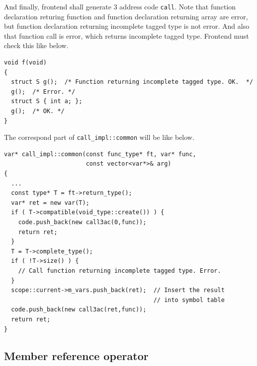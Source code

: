 And finally, frontend shall generate 3 address code {\tt{call}}.
Note that function declaration returing function and
function declaration returning array are error,
but function declaration returning incomplete tagged type
is not error. And also that function call is error, which 
returns incomplete tagged type. Frontend must check this like below.
\begin{verbatim}
void f(void)
{
  struct S g();  /* Function returning incomplete tagged type. OK.  */
  g();  /* Error. */
  struct S { int a; };
  g();  /* OK. */
}
\end{verbatim}
The correspond part of {\tt{call\_impl::common}} will be like below.
\begin{verbatim}
var* call_impl::common(const func_type* ft, var* func,
                       const vector<var*>& arg)
{
  ...
  const type* T = ft->return_type();
  var* ret = new var(T);
  if ( T->compatible(void_type::create()) ) {
    code.push_back(new call3ac(0,func));
    return ret;
  }
  T = T->complete_type();
  if ( !T->size() ) {
    // Call function returning incomplete tagged type. Error.
  }
  scope::current->m_vars.push_back(ret);  // Insert the result
                                          // into symbol table
  code.push_back(new call3ac(ret,func));
  return ret;
}
\end{verbatim}

\subsection{Member reference operator}
\label{expr_e024}

